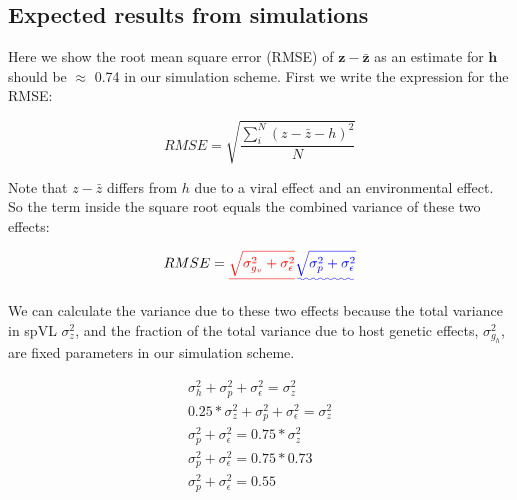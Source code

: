 \documentclass[11pt]{article} %
\providecommand{\DIFadd}[1]{{\protect\color{blue}\uwave{#1}}} %
\providecommand{\DIFdel}[1]{{\protect\color{red}\sout{#1}}}                      %
\providecommand{\DIFaddbegin}{} %
\providecommand{\DIFaddend}{} %
\providecommand{\DIFdelbegin}{} %
\providecommand{\DIFdelend}{} %
\newcommand{\DIFscaledelfig}{0.5}
\newlength{\DIFdelgraphicswidth} %
\newlength{\DIFdelgraphicsheight} %
\newcommand{\DIFaddincludegraphics}[2][]{{\color{blue}\fbox{\DIFOincludegraphics[#1]{#2}}}} %
\newcommand{\DIFdelincludegraphics}[2][]{%
\sbox{\DIFdelgraphicsbox}{\DIFOincludegraphics[#1]{#2}}%
\settoboxwidth{\DIFdelgraphicswidth}{\DIFdelgraphicsbox} %
\settoboxtotalheight{\DIFdelgraphicsheight}{\DIFdelgraphicsbox} %
\scalebox{\DIFscaledelfig}{%
\parbox[b]{\DIFdelgraphicswidth}{\usebox{\DIFdelgraphicsbox}\\[-\baselineskip] \rule{\DIFdelgraphicswidth}{0em}}\llap{\resizebox{\DIFdelgraphicswidth}{\DIFdelgraphicsheight}{%
\setlength{\unitlength}{\DIFdelgraphicswidth}%
\begin{picture}(1,1)%
\thicklines\linethickness{2pt} %
{\color[rgb]{1,0,0}\put(0,0){\framebox(1,1){}}}%
{\color[rgb]{1,0,0}\put(0,0){\line( 1,1){1}}}%
{\color[rgb]{1,0,0}\put(0,1){\line(1,-1){1}}}%
\end{picture}%
}\hspace*{3pt}}} %
} %
\DeclareRobustCommand{\DIFaddbegin}{\DIFOaddbegin \let\includegraphics\DIFaddincludegraphics} %
\DeclareRobustCommand{\DIFaddend}{\DIFOaddend \let\includegraphics\DIFOincludegraphics} %
\DeclareRobustCommand{\DIFdelbegin}{\DIFOdelbegin \let\includegraphics\DIFdelincludegraphics} %
\DeclareRobustCommand{\DIFdelend}{\DIFOaddend \let\includegraphics\DIFOincludegraphics} %
\begin{document}
\DIFaddbegin \begin{doublespace}

\DIFaddend \subsection*{Expected results from simulations}

Here we show the root mean square error (RMSE) of $\bm{z} - \bm{\bar{z}}$ as an estimate for $\bm{h}$ should be $\approx$ 0.74 in our simulation scheme. First we write the expression for the RMSE:

\begin{equation}
    RMSE = \sqrt{\frac{\sum_i^N(z - \bar{z} - h)^2}{N}}
\end{equation}

Note that $z - \bar{z}$ differs from $h$ due to a viral effect and an environmental effect. So the term inside the square root equals the combined variance of these two effects:

\begin{equation}
    RMSE = \DIFdelbegin \DIFdel{\sqrt{\sigma^2_{g_v} + \sigma^2_\epsilon}
}\DIFdelend \DIFaddbegin \DIFadd{\sqrt{\sigma^2_{p} + \sigma^2_\epsilon}
}\DIFaddend \end{equation}

We can calculate the variance due to these two effects because the total variance in spVL $\sigma^2_z$, and the fraction of the total variance due to host genetic effects, \DIFdelbegin \DIFdel{$\sigma^2_{g_h}$}\DIFdelend \DIFaddbegin \DIFadd{$\sigma^2_{h}$}\DIFaddend , are fixed parameters in our simulation scheme.

\begin{equation}
\DIFdelbegin %
\DIFdelend \DIFaddbegin \begin{split}
    \sigma^2_{h} + \sigma^2_{p} + \sigma^2_\epsilon = \sigma^2_z \\
    0.25 * \sigma^2_{z} + \sigma^2_{p} + \sigma^2_\epsilon = \sigma^2_z \\
    \sigma^2_{p} + \sigma^2_\epsilon = 0.75 * \sigma^2_z \\
    \sigma^2_{p} + \sigma^2_\epsilon = 0.75 * 0.73 \\
    \sigma^2_{p} + \sigma^2_\epsilon = 0.55
\end{split}\DIFaddend 
\end{equation}


\end{doublespace}
\end{document}
